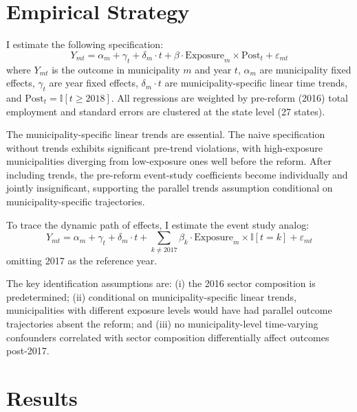 \documentclass[12pt]{article}
\newcommand{\ind}{\mathbb{I}}
\begin{document}




\section{Empirical Strategy}

I estimate the following specification:
\begin{equation}
Y_{mt} = \alpha_m + \gamma_t + \delta_m \cdot t + \beta \cdot \text{Exposure}_m \times \text{Post}_t + \varepsilon_{mt}
\label{eq:main}
\end{equation}
where $Y_{mt}$ is the outcome in municipality $m$ and year $t$, $\alpha_m$ are municipality fixed effects, $\gamma_t$ are year fixed effects, $\delta_m \cdot t$ are municipality-specific linear time trends, and $\text{Post}_t = \ind[t \geq 2018]$. All regressions are weighted by pre-reform (2016) total employment and standard errors are clustered at the state level (27 states).

The municipality-specific linear trends are essential. The naive specification without trends exhibits significant pre-trend violations, with high-exposure municipalities diverging from low-exposure ones well before the reform. After including trends, the pre-reform event-study coefficients become individually and jointly insignificant, supporting the parallel trends assumption conditional on municipality-specific trajectories.

To trace the dynamic path of effects, I estimate the event study analog:
\begin{equation}
Y_{mt} = \alpha_m + \gamma_t + \delta_m \cdot t + \sum_{k \neq 2017} \beta_k \cdot \text{Exposure}_m \times \ind[t = k] + \varepsilon_{mt}
\label{eq:eventstudy}
\end{equation}
omitting 2017 as the reference year.

The key identification assumptions are: (i) the 2016 sector composition is predetermined; (ii) conditional on municipality-specific linear trends, municipalities with different exposure levels would have had parallel outcome trajectories absent the reform; and (iii) no municipality-level time-varying confounders correlated with sector composition differentially affect outcomes post-2017.

\section{Results}
\end{document}
